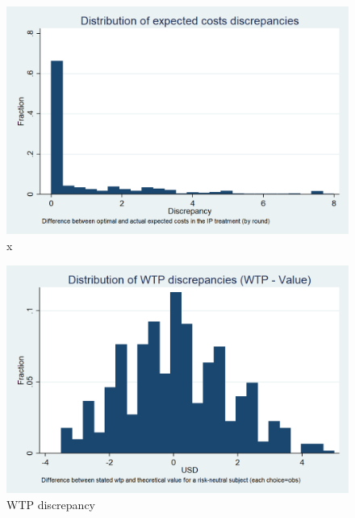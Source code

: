 \documentclass[11pt,a4paper]{article}
\begin{document}
\begin{figure}[!h]
\centering
\caption{x} \label{cost_discrepancy}

  \centering
  \includegraphics[scale=0.3]{Graphs/hist_costs_discr.png}

\end{figure}
\fi


\begin{figure}[!h]
\centering
\caption{WTP discrepancy} \label{WTP_discrepancy}

  \centering
  \includegraphics[scale=0.3]{Graphs/hist_WTP_discr1.png}

\end{figure}
\end{document}
